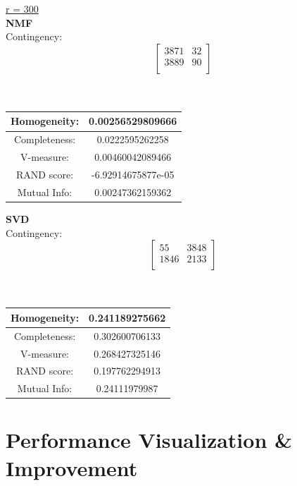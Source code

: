 \documentclass{report}
\begin{document}
\underline{r = 300} \\
\textbf{NMF} \\
Contingency: \[
\begin{bmatrix} 
3871   		& 32 \\
3889   		& 90 \\ 
\end{bmatrix}
\]
\\ \\


\begin{center}
\begin{tabu}{| c | c |}
\hline
Homogeneity: 		& 0.00256529809666 \\ 
\hline
Completeness: 		& 0.0222595262258 \\
\hline
V-measure: 			& 0.00460042089466 \\
\hline
RAND score: 		& -6.92914675877e-05 \\
\hline
Mutual Info: 		& 0.00247362159362 \\
\hline
\end{tabu}
\end{center}

\textbf{SVD} \\
Contingency: \[
\begin{bmatrix}
55 		& 3848 \\
1846 	& 2133 \\
\end{bmatrix}
\]
\\ \\


\begin{center}
\begin{tabu}{| c | c |}
\hline
Homogeneity: 		& 0.241189275662 \\
\hline
Completeness: 		& 0.302600706133 \\
\hline
V-measure: 			& 0.268427325146 \\
\hline
RAND score: 		& 0.197762294913 \\ 
\hline
Mutual Info: 		& 0.24111979987 \\
\hline
\end{tabu}
\end{center}


\section*{Performance Visualization & Improvement}
\end{document}
